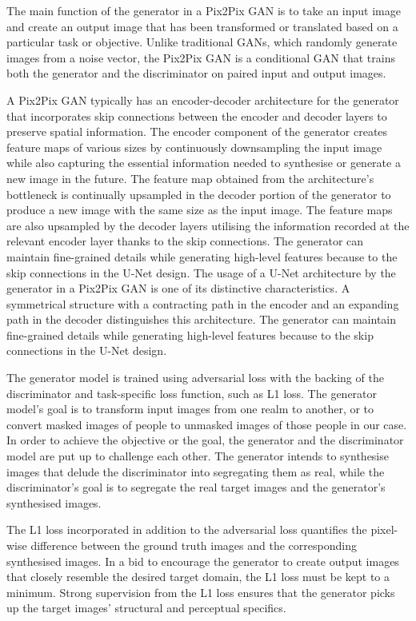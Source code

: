 \documentclass{./styles/svproc}
\begin{document}
The main function of the generator in a Pix2Pix GAN is to take an input image and create an output image that has been transformed or translated based on a particular task or objective. Unlike traditional GANs, which randomly generate images from a noise vector, the Pix2Pix GAN is a conditional GAN that trains both the generator and the discriminator on paired input and output images.

A Pix2Pix GAN typically has an encoder-decoder architecture for the generator that incorporates skip connections between the encoder and decoder layers to preserve spatial information. The encoder component of the generator creates feature maps of various sizes by continuously downsampling the input image while also capturing the essential information needed to synthesise or generate a new image in the future. The feature map obtained from the architecture's bottleneck is continually upsampled in the decoder portion of the generator to produce a new image with the same size as the input image. The feature maps are also upsampled by the decoder layers utilising the information recorded at the relevant encoder layer thanks to the skip connections. The generator can maintain fine-grained details while generating high-level features because to the skip connections in the U-Net design. The usage of a U-Net architecture by the generator in a Pix2Pix GAN is one of its distinctive characteristics. A symmetrical structure with a contracting path in the encoder and an expanding path in the decoder distinguishes this architecture. The generator can maintain fine-grained details while generating high-level features because to the skip connections in the U-Net design.

The generator model is trained using adversarial loss with the backing of the discriminator and task-specific loss function, such as L1 loss. The generator model's goal is to transform input images from one realm to another, or to convert masked images of people to unmasked images of those people in our case. In order to achieve the objective or the goal, the generator and the discriminator model are put up to challenge each other. The generator intends to synthesise images that delude the discriminator into segregating them as real, while the discriminator's goal is to segregate the real target images and the generator's synthesised images.

The L1 loss incorporated in addition to the adversarial loss quantifies the pixel-wise difference between the ground truth images and the corresponding synthesised images. In a bid to encourage the generator to create output images that closely resemble the desired target domain, the L1 loss must be kept to a minimum. Strong supervision from the L1 loss ensures that the generator picks up the target images' structural and perceptual specifics.
\end{document}
